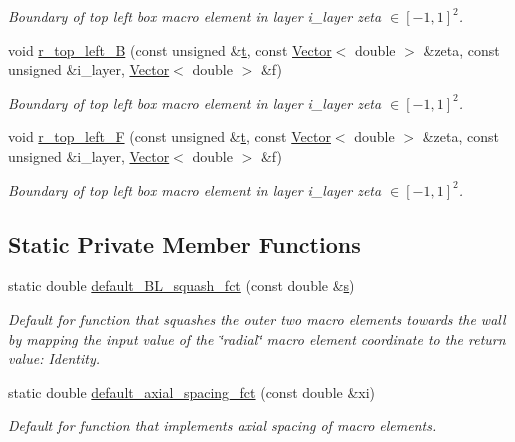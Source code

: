 \begin{DoxyCompactItemize}
\begin{DoxyCompactList}\small\item\em Boundary of top left box macro element in layer i\+\_\+layer zeta $ \in [-1,1]^2 $. \end{DoxyCompactList}\item 
void \hyperlink{classoomph_1_1QuarterTubeDomain_ab7a0b29926aff44bb26d5544c8dadfb0}{r\+\_\+top\+\_\+left\+\_\+B} (const unsigned \&\hyperlink{cfortran_8h_af6f0bd3dc13317f895c91323c25c2b8f}{t}, const \hyperlink{classoomph_1_1Vector}{Vector}$<$ double $>$ \&zeta, const unsigned \&i\+\_\+layer, \hyperlink{classoomph_1_1Vector}{Vector}$<$ double $>$ \&f)
\begin{DoxyCompactList}\small\item\em Boundary of top left box macro element in layer i\+\_\+layer zeta $ \in [-1,1]^2 $. \end{DoxyCompactList}\item 
void \hyperlink{classoomph_1_1QuarterTubeDomain_aee4f92da89db4fd8a7ff6e25995e1ca5}{r\+\_\+top\+\_\+left\+\_\+F} (const unsigned \&\hyperlink{cfortran_8h_af6f0bd3dc13317f895c91323c25c2b8f}{t}, const \hyperlink{classoomph_1_1Vector}{Vector}$<$ double $>$ \&zeta, const unsigned \&i\+\_\+layer, \hyperlink{classoomph_1_1Vector}{Vector}$<$ double $>$ \&f)
\begin{DoxyCompactList}\small\item\em Boundary of top left box macro element in layer i\+\_\+layer zeta $ \in [-1,1]^2 $. \end{DoxyCompactList}\end{DoxyCompactItemize}
\subsection*{Static Private Member Functions}
\begin{DoxyCompactItemize}
\item 
static double \hyperlink{classoomph_1_1QuarterTubeDomain_a3dc9c2857eb6bd7e3ee89d2a7c86bd3b}{default\+\_\+\+B\+L\+\_\+squash\+\_\+fct} (const double \&\hyperlink{cfortran_8h_ab7123126e4885ef647dd9c6e3807a21c}{s})
\begin{DoxyCompactList}\small\item\em Default for function that squashes the outer two macro elements towards the wall by mapping the input value of the \char`\"{}radial\char`\"{} macro element coordinate to the return value\+: Identity. \end{DoxyCompactList}\item 
static double \hyperlink{classoomph_1_1QuarterTubeDomain_ae568259fc1321c4bcbfae24e42e3b0f6}{default\+\_\+axial\+\_\+spacing\+\_\+fct} (const double \&xi)
\begin{DoxyCompactList}\small\item\em Default for function that implements axial spacing of macro elements. \end{DoxyCompactList}\end{DoxyCompactItemize}

